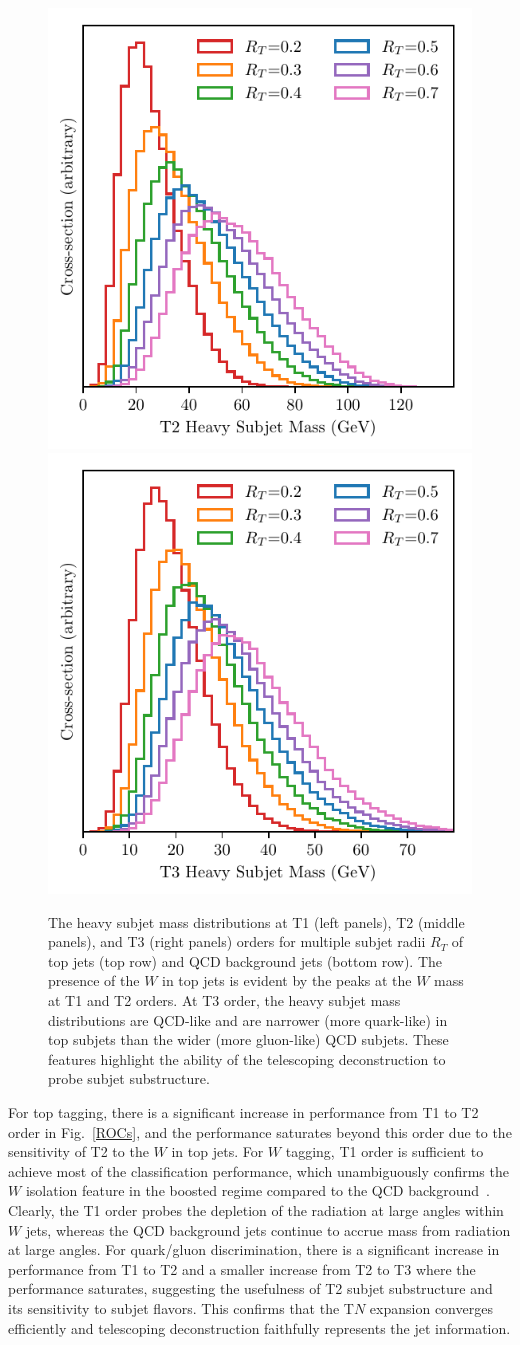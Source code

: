 \documentclass[notoc]{JHEP3}
\DeclareRobustCommand{\Fig}[1]{Fig.~\ref{#1}}
\begin{document}
\begin{figure}
\includegraphics[width=.32\columnwidth]{figures/T2HeavyMass_qcd.pdf}
\includegraphics[width=.32\columnwidth]{figures/T3HeavyMass_qcd.pdf}
\caption{\label{masses}The heavy subjet mass distributions at T1 (left panels), T2 (middle panels), and T3 (right panels) orders for multiple subjet radii $R_T$ of top jets (top row) and QCD background jets (bottom row). The presence of the $W$ in top jets is evident by the peaks at the $W$ mass at T1 and T2 orders. At T3 order, the heavy subjet mass distributions are QCD-like and are narrower (more quark-like) in %
top subjets than the wider (more gluon-like) QCD subjets. These features highlight the ability of the telescoping deconstruction to probe subjet substructure.}
\end{figure}

For top tagging, there is a significant increase in performance from T1 to T2 order in \Fig{ROCs}, and the performance saturates beyond this order due to the sensitivity of T2 to the $W$ in top jets. For $W$ tagging, T1 order is sufficient to achieve most of the classification performance, which unambiguously confirms the $W$ isolation feature in the boosted regime compared to the QCD background~\cite{Chien:2017xrb}. Clearly, the T1 order probes the depletion of the radiation at large angles within $W$ jets, whereas the QCD background jets continue to accrue mass from radiation at large angles. For quark/gluon discrimination, there is a significant increase in performance from T1 to T2 and a smaller increase from T2 to T3 where the performance saturates, suggesting the usefulness of T2 subjet substructure and its sensitivity to subjet flavors. This confirms that the T$N$ expansion converges efficiently and telescoping deconstruction faithfully represents the jet information.
\end{document}
